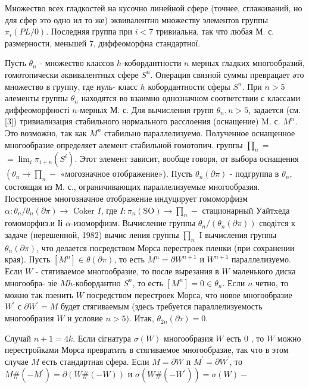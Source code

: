 \documentclass[10pt]{article}
\begin{document}
Множество всех гладкостей на кусочно линейной сфере (точнее, сглаживаний, но для сфер это одно ил то же) эквивалентно множеству элементов группы $\pi_{i}(P L / 0)$. Последняя группа при $i<7$ тривиальна, так что любая М. с. размерности, меньшей 7, диффеоморфна стандартної.



Пусть $\theta_{n}$ - множество классов $h$-кобордантности $n$ мерных гладких многообразий, гомотопически әквивалентных сфере $S^{n}$. Операция связной суммы преврацает әто множество в группу, где нуль- класс $h$ кобордантности сферы $S^{n}$. При $n>5$ әлементы группы $\theta_{n}$ находятся во взаимно однозначном соответствии с классами диффеоморфності $n$-мерных М. с. Для вычисления групп $\theta_{n}, n>5$, задается (см. [3]) тривиализация стабильного нормального расслоения (оснащение) M. с. $M^{n}$. Это возможно, так как $M^{n}$ стабильно параллелизуемо. Полученное оснащенное многообразие определяет әлемент стабильной гомотопич. группы $\prod_{n}=$ $=\lim _{i} \pi_{i+n}\left(S^{i}\right)$. Этот элемент зависит, вообще говоря, от выбора оснащения $\left(\theta_{n} \rightarrow \prod_{n}-\right.$ «могозначное отображение»). Пусть $\theta_{n}(\partial \pi)$ - подгруппа в $\theta_{n}$, состоящая из М. с., ограничивающих параллелизуемые многообразия. Построенное многозначное отображение индуцирует гомоморфизм $\alpha: \theta_{n} / \theta_{n}(\partial \pi) \rightarrow$ Coker $I$, где $I: \pi_{n}(\mathrm{SO}) \rightarrow \prod_{n}-$ стационарный Уайтxеда гомомор$ф и з . и$ Іі $\alpha$-изоморфизм. Вычисление группы $\theta_{n} /\left(\theta_{n}(\partial \pi)\right)$ сводітся к задаче (нерешенной, 1982) вычис ления группы $\prod_{n}$ I вычисления группы $\theta_{n}(\partial \pi)$, что делается посредством Морса перестроек пленки (при сохранении края). Пусть $\left[M^{n}\right] \in \theta(\partial \pi)$, то есть $M^{n}=\partial W^{n+1}$ и $W^{n+1}$ параллелизуемо. Если $W$ - стягиваемое многообразие, то после вырезания в $W$ маленького диска многообра- зіе $M h$-кобордантно $S^{n}$, то есть $\left[M^{n}\right]=0 \in \theta_{n}$. Если $n$ четно, то можно так пзенить $W$ посредством перестроек Морса, что новое многообразие $W^{\prime}$ с $\partial W^{\prime}=M$ будет стягиваемым (здесь требуется параллелизуемость многообразия $W$ и условие $n>5)$. Итак, $\theta_{2 n}(\partial \tau)=0$.



Случай $n+1=4 k$. Если сігнатура $\sigma(W)$ многообразия $W$ есть 0 , то $W$ можно перестройками Морса превратить в стягиваемое многообразие, так что в этом случае $M$ есть стандартная сфера. Если $M=\partial W$ п $M^{\prime}=\partial W^{\prime}$, то $M \#\left(-M^{\prime}\right)=\partial(W \#(-W))$ и $\sigma\left(W \#\left(-W^{\prime}\right)\right)=\sigma(W)-$
\end{document}
